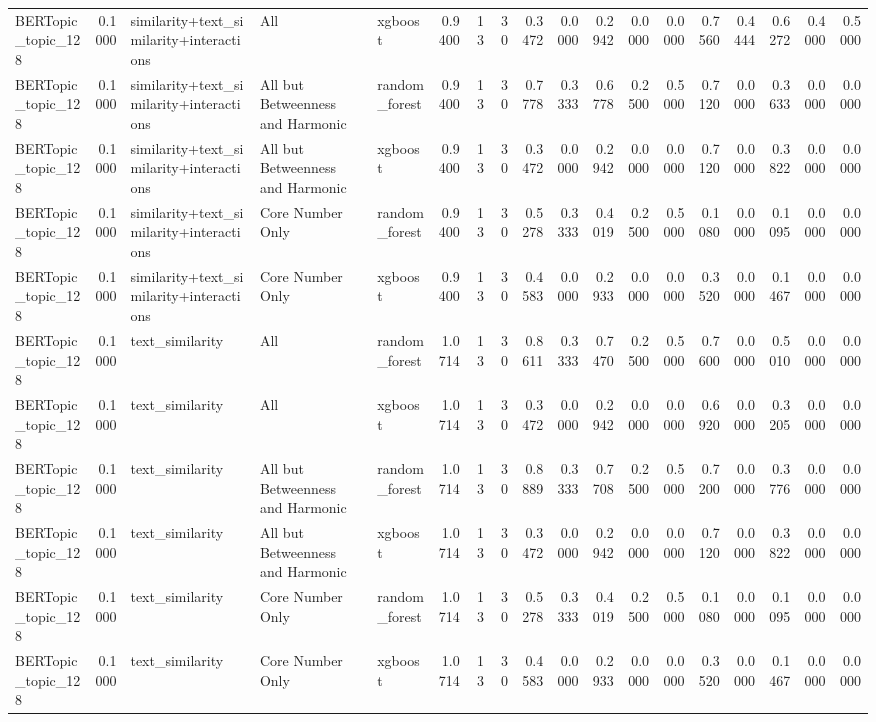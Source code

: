 \begin{tabular}{lrlllrrrrrrrrrrrrr}
BERTopic_topic_128 & 0.1000 & similarity+text_similarity+interactions & All & xgboost & 0.9400 & 13 & 30 & 0.3472 & 0.0000 & 0.2942 & 0.0000 & 0.0000 & 0.7560 & 0.4444 & 0.6272 & 0.4000 & 0.5000 \\
BERTopic_topic_128 & 0.1000 & similarity+text_similarity+interactions & All but Betweenness and Harmonic & random_forest & 0.9400 & 13 & 30 & 0.7778 & 0.3333 & 0.6778 & 0.2500 & 0.5000 & 0.7120 & 0.0000 & 0.3633 & 0.0000 & 0.0000 \\
BERTopic_topic_128 & 0.1000 & similarity+text_similarity+interactions & All but Betweenness and Harmonic & xgboost & 0.9400 & 13 & 30 & 0.3472 & 0.0000 & 0.2942 & 0.0000 & 0.0000 & 0.7120 & 0.0000 & 0.3822 & 0.0000 & 0.0000 \\
BERTopic_topic_128 & 0.1000 & similarity+text_similarity+interactions & Core Number Only & random_forest & 0.9400 & 13 & 30 & 0.5278 & 0.3333 & 0.4019 & 0.2500 & 0.5000 & 0.1080 & 0.0000 & 0.1095 & 0.0000 & 0.0000 \\
BERTopic_topic_128 & 0.1000 & similarity+text_similarity+interactions & Core Number Only & xgboost & 0.9400 & 13 & 30 & 0.4583 & 0.0000 & 0.2933 & 0.0000 & 0.0000 & 0.3520 & 0.0000 & 0.1467 & 0.0000 & 0.0000 \\
BERTopic_topic_128 & 0.1000 & text_similarity & All & random_forest & 1.0714 & 13 & 30 & 0.8611 & 0.3333 & 0.7470 & 0.2500 & 0.5000 & 0.7600 & 0.0000 & 0.5010 & 0.0000 & 0.0000 \\
BERTopic_topic_128 & 0.1000 & text_similarity & All & xgboost & 1.0714 & 13 & 30 & 0.3472 & 0.0000 & 0.2942 & 0.0000 & 0.0000 & 0.6920 & 0.0000 & 0.3205 & 0.0000 & 0.0000 \\
BERTopic_topic_128 & 0.1000 & text_similarity & All but Betweenness and Harmonic & random_forest & 1.0714 & 13 & 30 & 0.8889 & 0.3333 & 0.7708 & 0.2500 & 0.5000 & 0.7200 & 0.0000 & 0.3776 & 0.0000 & 0.0000 \\
BERTopic_topic_128 & 0.1000 & text_similarity & All but Betweenness and Harmonic & xgboost & 1.0714 & 13 & 30 & 0.3472 & 0.0000 & 0.2942 & 0.0000 & 0.0000 & 0.7120 & 0.0000 & 0.3822 & 0.0000 & 0.0000 \\
BERTopic_topic_128 & 0.1000 & text_similarity & Core Number Only & random_forest & 1.0714 & 13 & 30 & 0.5278 & 0.3333 & 0.4019 & 0.2500 & 0.5000 & 0.1080 & 0.0000 & 0.1095 & 0.0000 & 0.0000 \\
BERTopic_topic_128 & 0.1000 & text_similarity & Core Number Only & xgboost & 1.0714 & 13 & 30 & 0.4583 & 0.0000 & 0.2933 & 0.0000 & 0.0000 & 0.3520 & 0.0000 & 0.1467 & 0.0000 & 0.0000 \\

\end{tabular}
